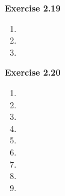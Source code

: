 \textbf{Exercise 2.19}
\begin{enumerate}
    \item 
    \item 
    \item 
\end{enumerate}

\textbf{Exercise 2.20}
\begin{enumerate}
    \item 
    \item 
    \item 
    \item 
    \item 
    \item 
    \item 
    \item 
    \item 
\end{enumerate}


